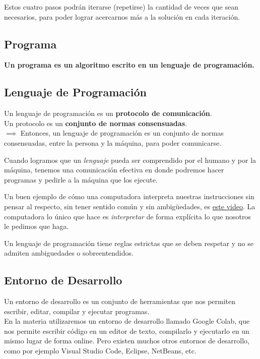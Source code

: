 \documentclass[
  letterpaper,
  DIV=11,
  numbers=noendperiod]{scrreprt}
\begin{document}
Estos cuatro pasos podrán iterarse (repetirse) la cantidad de veces que
sean necesarios, para poder lograr acercarnos más a la solución en cada
iteración.

\subsection{Programa}\label{programa}

\textbf{Un programa es un algoritmo escrito en un lenguaje de
programación.}

\subsection{Lenguaje de Programación}\label{lenguaje-de-programaciuxf3n}

Un lenguaje de programación es un \textbf{protocolo de comunicación}.\\
Un protocolo es un \textbf{conjunto de normas consensuadas}.\\
\(\implies\) Entonces, un lenguaje de programación es un conjunto de
normas consensuadas, entre la persona y la máquina, para poder
comunicarse.

Cuando logramos que un \emph{lenguaje} pueda ser comprendido por el
humano y por la máquina, tenemos una comunicación efectiva en donde
podremos hacer programas y pedirle a la máquina que los ejecute.

Un buen ejemplo de cómo una computadora interpreta nuestras
instrucciones sin pensar al respecto, sin tener sentido común y sin
ambigüedades, es \href{https://www.youtube.com/watch?v=cDA3_5982h8}{este
video}. La computadora lo único que hace es \emph{interpretar} de forma
explícita lo que nosotros le pedimos que haga.

Un lenguaje de programación tiene reglas estrictas que se deben respetar
y no se admiten ambiguedades o sobreentendidos.

\subsection{Entorno de Desarrollo}\label{entorno-de-desarrollo}

Un entorno de desarrollo es un conjunto de herramientas que nos permiten
escribir, editar, compilar y ejecutar programas.\\

En la materia utilizaremos un entorno de desarrollo llamado Google
Colab, que nos permite escribir código en un editor de texto, compilarlo
y ejecutarlo en un mismo lugar de forma online. Pero existen muchos
otros entornos de desarrollo, como por ejemplo Visual Studio Code,
Eclipse, NetBeans, etc.
\end{document}
